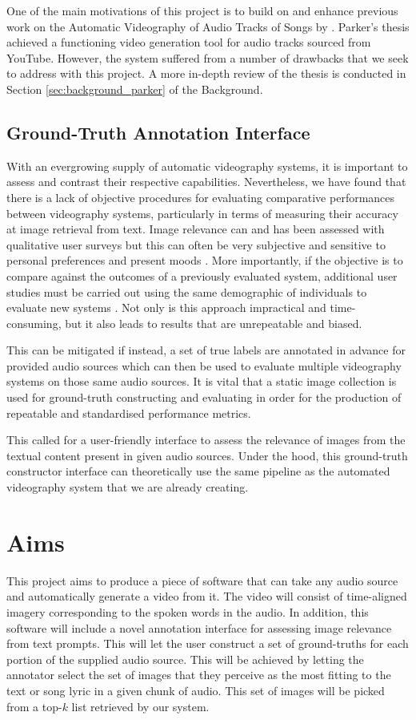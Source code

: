 \documentclass{l4proj}
\begin{document}
One of the main motivations of this project is to build on and enhance previous work on the Automatic Videography of Audio Tracks of Songs by \cite{parker}. Parker's thesis achieved a functioning video generation tool for audio tracks sourced from YouTube. However, the system suffered from a number of drawbacks that we seek to address with this project. A more in-depth review of the thesis is conducted in Section \ref{sec:background_parker} of the Background.

\subsection{Ground-Truth Annotation Interface}
With an evergrowing supply of automatic videography systems, it is important to assess and contrast their respective capabilities. Nevertheless, we have found that there is a lack of objective procedures for evaluating comparative performances between videography systems, particularly in terms of measuring their accuracy at image retrieval from text. Image relevance can and has been assessed with qualitative user surveys but this can often be very subjective and sensitive to personal preferences and present moods \citep{mohammadi2014subjective}. More importantly, if the objective is to compare against the outcomes of a previously evaluated system, additional user studies must be carried out using the same demographic of individuals to evaluate new systems \citep{voorhees2005trec}. Not only is this approach impractical and time-consuming, but it also leads to results that are unrepeatable and biased.

This can be mitigated if instead, a set of true labels are annotated in advance for provided audio sources which can then be used to evaluate multiple videography systems on those same audio sources. It is vital that a static image collection is used for ground-truth constructing and evaluating in order for the production of repeatable and standardised performance metrics.

This called for a user-friendly interface to assess the relevance of images from the textual content present in given audio sources. Under the hood, this ground-truth constructor interface can theoretically use the same pipeline as the automated videography system that we are already creating. 


\section{Aims}
This project aims to produce a piece of software that can take any audio source and automatically generate a video from it. The video will consist of time-aligned imagery corresponding to the spoken words in the audio. In addition, this software will include a novel annotation interface for assessing image relevance from text prompts. This will let the user construct a set of ground-truths for each portion of the supplied audio source. This will be achieved by letting the annotator select the set of images that they perceive as the most fitting to the text or song lyric in a given chunk of audio. This set of images will be picked from a top-$k$ list retrieved by our system.
\end{document}
